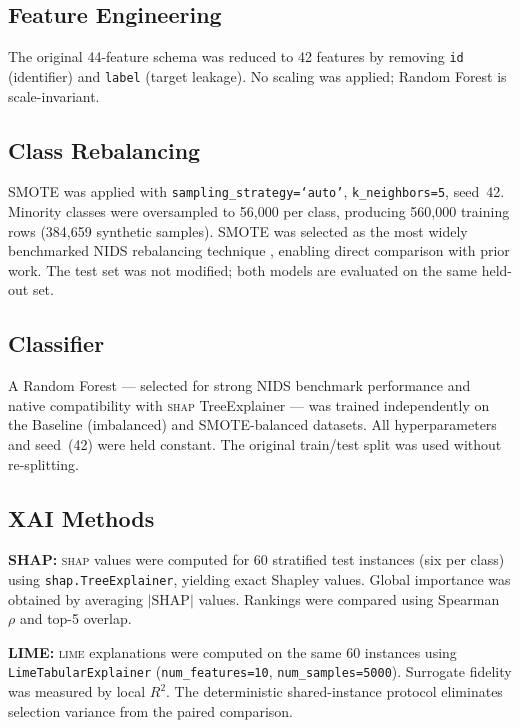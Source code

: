 \documentclass[conference,a4paper]{IEEEtran}
\newcommand{\SHAP}{\textsc{shap}\xspace}
\newcommand{\LIME}{\textsc{lime}\xspace}
\newcommand{\NIDS}{NIDS\xspace}
\newcommand{\SMOTE}{SMOTE\xspace}
\begin{document}
\subsection{Feature Engineering}

The original 44-feature schema was reduced to 42 features by removing
\texttt{id} (identifier) and \texttt{label} (target leakage). No scaling was
applied; Random Forest is scale-invariant.

\subsection{Class Rebalancing}

\SMOTE \cite{chawla2002} was applied with \texttt{sampling\_strategy=`auto'},
\texttt{k\_neighbors=5}, seed~42. Minority classes were oversampled to 56,000
per class, producing 560,000 training rows (384,659 synthetic samples). \SMOTE
was selected as the most widely benchmarked \NIDS rebalancing technique
\cite{alshamy2021,wu2022}, enabling direct comparison with prior work. The test
set was not modified; both models are evaluated on the same held-out set.

\subsection{Classifier}

A Random Forest \cite{breiman2001} --- selected for strong \NIDS benchmark
performance and native compatibility with \SHAP TreeExplainer --- was trained
independently on the Baseline (imbalanced) and \SMOTE-balanced datasets. All
hyperparameters and seed~(42) were held constant. The original train/test split
was used without re-splitting.

\subsection{XAI Methods}

\noindent\textbf{SHAP:} \SHAP values \cite{lundberg2017,lundberg2020} were
computed for 60 stratified test instances (six per class) using
\texttt{shap.TreeExplainer}, yielding exact Shapley values. Global importance
was obtained by averaging $|\text{SHAP}|$ values. Rankings were compared using
Spearman~$\rho$ and top-5 overlap.

\smallskip\noindent\textbf{LIME:} \LIME explanations \cite{ribeiro2016} were
computed on the same 60 instances using \texttt{LimeTabularExplainer}
(\texttt{num\_features=10}, \texttt{num\_samples=5000}). Surrogate fidelity
was measured by local $R^2$. The deterministic shared-instance protocol
eliminates selection variance from the paired comparison.
\end{document}
